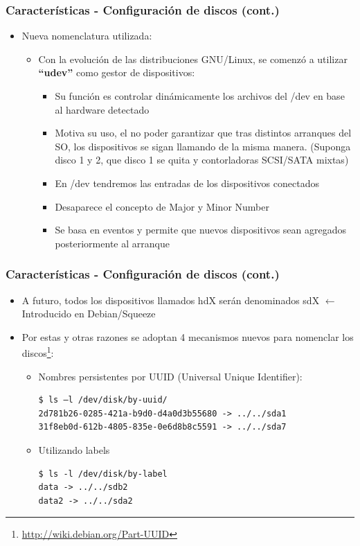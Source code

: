 \begin{frame}
  \frametitle{Características - Configuración de discos (cont.)}
  \begin{itemize}
	  \item Nueva nomenclatura utilizada:
	  \begin{itemize}
	  	\item Con la evolución de las distribuciones GNU/Linux, se comenzó a utilizar \textbf{``udev''} como gestor de dispositivos:
	  	\begin{itemize}
		  	\item Su función es controlar dinámicamente los archivos del /dev en base al hardware detectado
		  	\item Motiva su uso, el no poder garantizar que tras distintos arranques del SO, los dispositivos se sigan llamando de la misma manera. (Suponga disco 1 y 2, que disco 1 se quita y contorladoras SCSI/SATA mixtas)
		  	\item En /dev tendremos las entradas de los dispositivos conectados
		  	\item Desaparece el concepto de Major y Minor Number
		  	\item Se basa en eventos y permite que nuevos dispositivos sean agregados posteriormente al arranque
	  	\end{itemize}
	  \end{itemize}
  \end{itemize}
\end{frame}

\begin{frame}[fragile]
  \frametitle{Características - Configuración de discos (cont.)}
  \begin{itemize}
	  \item A futuro, todos los dispositivos llamados hdX serán denominados sdX $\leftarrow$ Introducido en Debian/Squeeze
	  \item Por estas y otras razones se adoptan 4 mecanismos nuevos para nomenclar los discos\footnote{\url{http://wiki.debian.org/Part-UUID}}:
	  \begin{itemize}
	  	\item Nombres persistentes por UUID (\tiny{Universal Unique Identifier}):
	  	\begin{lstlisting}
$ ls –l /dev/disk/by-uuid/
2d781b26-0285-421a-b9d0-d4a0d3b55680 -> ../../sda1
31f8eb0d-612b-4805-835e-0e6d8b8c5591 -> ../../sda7
		\end{lstlisting}
		\item Utilizando labels
		\begin{lstlisting}
$ ls -l /dev/disk/by-label
data -> ../../sdb2
data2 -> ../../sda2
		\end{lstlisting}
	  \end{itemize}
  \end{itemize}
\end{frame}


